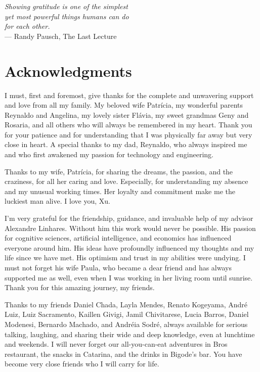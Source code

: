 
\begin{flushright}{\slshape
	Showing gratitude is one of the simplest\\
    yet most powerful things humans can do\\
    for each other.} \\ \medskip
    --- Randy Pausch, The Last Lecture
\end{flushright}

\bigskip

\begingroup
\let\clearpage\relax
\let\cleardoublepage\relax
\let\cleardoublepage\relax
\chapter*{Acknowledgments}

I must, first and foremost, give thanks for the complete and unwavering support and love from all my family. My beloved wife Patrícia, my wonderful parents Reynaldo and Angelina, my lovely sister Flávia, my sweet grandmas Geny and Rosaria, and all others who will always be remembered in my heart. Thank you for your patience and for understanding that I was physically far away but very close in heart. A special thanks to my dad, Reynaldo, who always inspired me and who first awakened my passion for technology and engineering.

Thanks to my wife, Patrícia, for sharing the dreams, the passion, and the craziness, for all her caring and love. Especially, for understanding my absence and my unusual working times. Her loyalty and commitment make me the luckiest man alive. I love you, Xu.

I'm very grateful for the friendship, guidance, and invaluable help of my advisor Alexandre Linhares. Without him this work would never be possible. His passion for cognitive sciences, artificial intelligence, and economics has influenced everyone around him. His ideas have profoundly influenced my thoughts and my life since we have met. His optimism and trust in my abilities were undying. I must not forget his wife Paula, who became a dear friend and has always supported me as well, even when I was working in her living room until sunrise. Thank you for this amazing journey, my friends.

Thanks to my friends Daniel Chada, Layla Mendes, Renato Kogeyama, André Luiz, Luiz Sacramento, Kaillen Givigi, Jamil Chivitarese, Lucia Barros, Daniel Modenesi, Bernardo Machado, and Andréia Sodré, always available for serious talking, laughing, and sharing their wide and deep knowledge, even at lunchtime and weekends. I will never forget our all-you-can-eat adventures in Bros restaurant, the snacks in Catarina, and the drinks in Bigode's bar. You have become very close friends who I will carry for life.

